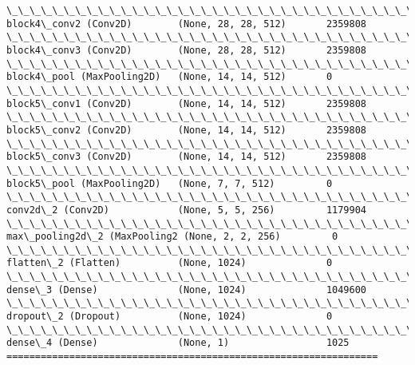 \documentclass[11pt]{article}
\begin{document}
\begin{Verbatim}[commandchars=\\\{\}]
\_\_\_\_\_\_\_\_\_\_\_\_\_\_\_\_\_\_\_\_\_\_\_\_\_\_\_\_\_\_\_\_\_\_\_\_\_\_\_\_\_\_\_\_\_\_\_\_\_\_\_\_\_\_\_\_\_\_\_\_\_\_\_\_\_
block4\_conv2 (Conv2D)        (None, 28, 28, 512)       2359808   
\_\_\_\_\_\_\_\_\_\_\_\_\_\_\_\_\_\_\_\_\_\_\_\_\_\_\_\_\_\_\_\_\_\_\_\_\_\_\_\_\_\_\_\_\_\_\_\_\_\_\_\_\_\_\_\_\_\_\_\_\_\_\_\_\_
block4\_conv3 (Conv2D)        (None, 28, 28, 512)       2359808   
\_\_\_\_\_\_\_\_\_\_\_\_\_\_\_\_\_\_\_\_\_\_\_\_\_\_\_\_\_\_\_\_\_\_\_\_\_\_\_\_\_\_\_\_\_\_\_\_\_\_\_\_\_\_\_\_\_\_\_\_\_\_\_\_\_
block4\_pool (MaxPooling2D)   (None, 14, 14, 512)       0         
\_\_\_\_\_\_\_\_\_\_\_\_\_\_\_\_\_\_\_\_\_\_\_\_\_\_\_\_\_\_\_\_\_\_\_\_\_\_\_\_\_\_\_\_\_\_\_\_\_\_\_\_\_\_\_\_\_\_\_\_\_\_\_\_\_
block5\_conv1 (Conv2D)        (None, 14, 14, 512)       2359808   
\_\_\_\_\_\_\_\_\_\_\_\_\_\_\_\_\_\_\_\_\_\_\_\_\_\_\_\_\_\_\_\_\_\_\_\_\_\_\_\_\_\_\_\_\_\_\_\_\_\_\_\_\_\_\_\_\_\_\_\_\_\_\_\_\_
block5\_conv2 (Conv2D)        (None, 14, 14, 512)       2359808   
\_\_\_\_\_\_\_\_\_\_\_\_\_\_\_\_\_\_\_\_\_\_\_\_\_\_\_\_\_\_\_\_\_\_\_\_\_\_\_\_\_\_\_\_\_\_\_\_\_\_\_\_\_\_\_\_\_\_\_\_\_\_\_\_\_
block5\_conv3 (Conv2D)        (None, 14, 14, 512)       2359808   
\_\_\_\_\_\_\_\_\_\_\_\_\_\_\_\_\_\_\_\_\_\_\_\_\_\_\_\_\_\_\_\_\_\_\_\_\_\_\_\_\_\_\_\_\_\_\_\_\_\_\_\_\_\_\_\_\_\_\_\_\_\_\_\_\_
block5\_pool (MaxPooling2D)   (None, 7, 7, 512)         0         
\_\_\_\_\_\_\_\_\_\_\_\_\_\_\_\_\_\_\_\_\_\_\_\_\_\_\_\_\_\_\_\_\_\_\_\_\_\_\_\_\_\_\_\_\_\_\_\_\_\_\_\_\_\_\_\_\_\_\_\_\_\_\_\_\_
conv2d\_2 (Conv2D)            (None, 5, 5, 256)         1179904   
\_\_\_\_\_\_\_\_\_\_\_\_\_\_\_\_\_\_\_\_\_\_\_\_\_\_\_\_\_\_\_\_\_\_\_\_\_\_\_\_\_\_\_\_\_\_\_\_\_\_\_\_\_\_\_\_\_\_\_\_\_\_\_\_\_
max\_pooling2d\_2 (MaxPooling2 (None, 2, 2, 256)         0         
\_\_\_\_\_\_\_\_\_\_\_\_\_\_\_\_\_\_\_\_\_\_\_\_\_\_\_\_\_\_\_\_\_\_\_\_\_\_\_\_\_\_\_\_\_\_\_\_\_\_\_\_\_\_\_\_\_\_\_\_\_\_\_\_\_
flatten\_2 (Flatten)          (None, 1024)              0         
\_\_\_\_\_\_\_\_\_\_\_\_\_\_\_\_\_\_\_\_\_\_\_\_\_\_\_\_\_\_\_\_\_\_\_\_\_\_\_\_\_\_\_\_\_\_\_\_\_\_\_\_\_\_\_\_\_\_\_\_\_\_\_\_\_
dense\_3 (Dense)              (None, 1024)              1049600   
\_\_\_\_\_\_\_\_\_\_\_\_\_\_\_\_\_\_\_\_\_\_\_\_\_\_\_\_\_\_\_\_\_\_\_\_\_\_\_\_\_\_\_\_\_\_\_\_\_\_\_\_\_\_\_\_\_\_\_\_\_\_\_\_\_
dropout\_2 (Dropout)          (None, 1024)              0         
\_\_\_\_\_\_\_\_\_\_\_\_\_\_\_\_\_\_\_\_\_\_\_\_\_\_\_\_\_\_\_\_\_\_\_\_\_\_\_\_\_\_\_\_\_\_\_\_\_\_\_\_\_\_\_\_\_\_\_\_\_\_\_\_\_
dense\_4 (Dense)              (None, 1)                 1025      
=================================================================

\end{Verbatim}
\end{document}
